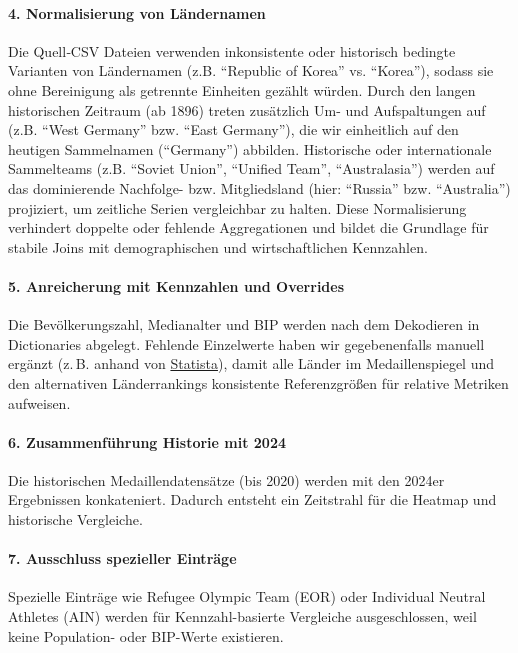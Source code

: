 \paragraph{4. Normalisierung von Ländernamen}
Die Quell‑CSV Dateien verwenden inkonsistente oder historisch bedingte Varianten von Ländernamen (z.B. \enquote{Republic of Korea} vs. \enquote{Korea}), sodass sie ohne Bereinigung als getrennte Einheiten gezählt würden. Durch den langen historischen Zeitraum (ab 1896) treten zusätzlich Um- und Aufspaltungen auf (z.B. \enquote{West Germany} bzw. \enquote{East Germany}), die wir einheitlich auf den heutigen Sammelnamen (\enquote{Germany}) abbilden. Historische oder internationale Sammelteams (z.B. \enquote{Soviet Union}, \enquote{Unified Team}, \enquote{Australasia}) werden auf das dominierende Nachfolge- bzw. Mitgliedsland (hier: \enquote{Russia} bzw. \enquote{Australia}) projiziert, um zeitliche Serien vergleichbar zu halten. Diese Normalisierung verhindert doppelte oder fehlende Aggregationen und bildet die Grundlage für stabile Joins mit demographischen und wirtschaftlichen Kennzahlen.

\paragraph{5. Anreicherung mit Kennzahlen und Overrides} 
Die Bevölkerungszahl, Medianalter und BIP werden nach dem Dekodieren in Dictionaries abgelegt. Fehlende Einzelwerte haben wir gegebenenfalls manuell ergänzt (z.\,B. anhand von \href{https://www.statista.com}{Statista}), damit alle Länder im Medaillenspiegel und den alternativen Länderrankings konsistente Referenzgrößen für relative Metriken aufweisen.

\paragraph{6. Zusammenführung Historie mit 2024}
Die historischen Medaillendatensätze (bis 2020) werden mit den 2024er Ergebnissen konkateniert. Dadurch entsteht ein Zeitstrahl für die Heatmap und historische Vergleiche.

\paragraph{7. Ausschluss spezieller Einträge}
Spezielle Einträge wie Refugee Olympic Team (EOR) oder Individual Neutral Athletes (AIN) werden für Kennzahl-basierte Vergleiche ausgeschlossen, weil keine Population- oder BIP-Werte existieren.